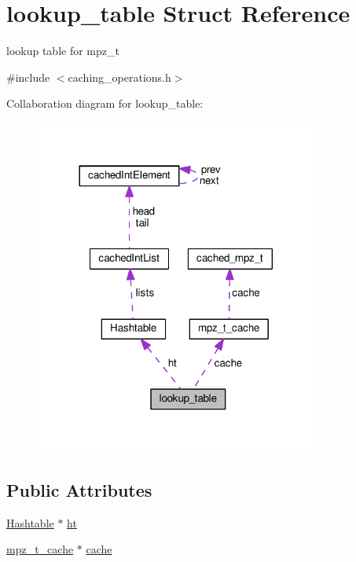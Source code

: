 \hypertarget{structlookup__table}{}\section{lookup\+\_\+table Struct Reference}
\label{structlookup__table}


lookup table for mpz\+\_\+t  




{\ttfamily \#include $<$caching\+\_\+operations.\+h$>$}



Collaboration diagram for lookup\+\_\+table\+:\nopagebreak
\begin{figure}[H]
\begin{center}
\leavevmode
\includegraphics[width=264pt]{structlookup__table__coll__graph}
\end{center}
\end{figure}
\subsection*{Public Attributes}
\begin{DoxyCompactItemize}
\item 
\hyperlink{structHashtable}{Hashtable} $\ast$ \hyperlink{structlookup__table_a2066d36e3a0f245e7f428f1e951cd947}{ht}
\item 
\hyperlink{structmpz__t__cache}{mpz\+\_\+t\+\_\+cache} $\ast$ \hyperlink{structlookup__table_a120547b02b115a402c758cf630ed22b1}{cache}
\end{DoxyCompactItemize}


